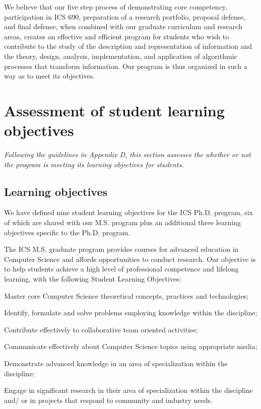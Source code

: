 \documentclass[12pt]{article}
\begin{document}
We believe that our five step process of demonstrating core competency,
participation in ICS 690, preparation of a research portfolio, proposal
defense, and final defense, when combined with our graduate curriculum and
research areas, creates an effective and efficient program for students who
wish to contribute to the study of the description and representation of
information and the theory, design, analysis, implementation, and
application of algorithmic processes that transform information. Our
program is thus organized in such a way as to meet its objectives.


\section{Assessment of student learning objectives}

{\em Following the guidelines in Appendix D, this section assesses the
  whether or not the program is meeting its learning objectives for
  students. }

\subsection{Learning objectives}

We have defined nine student learning objectives for the ICS Ph.D. program,
six of which are shared with our M.S. program plus an additional three
learning objectives specific to the Ph.D. program.

The ICS M.S. graduate program provides courses for advanced education in
Computer Science and affords opportunities to conduct research. Our
objective is to help students achieve a high level of professional
competence and lifelong learning, with the following Student Learning
Objectives:

\begin{list}{.}{}
\item Master core Computer Science theoretical concepts, practices and technologies;
\item Identify, formulate and solve problems employing knowledge within the discipline;
\item Contribute effectively to collaborative team oriented activities;
\item Communicate effectively about Computer Science topics using appropriate media;
\item Demonstrate advanced knowledge in an area of specialization within the discipline;
\item Engage in significant research in their area of specialization within the discipline and/
or in projects that respond to community and industry needs.
\end{list}
\end{document}
